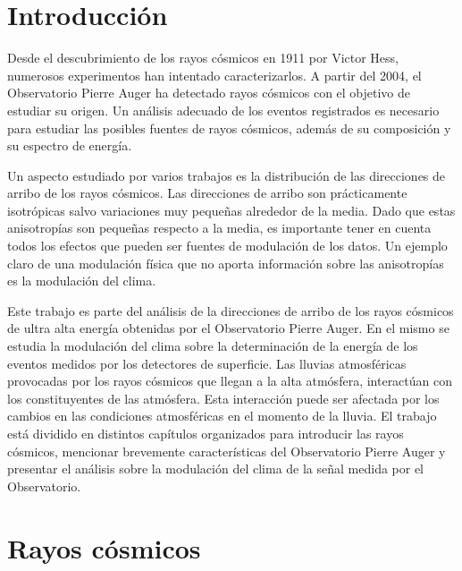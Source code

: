 \chapter{Introducción}


Desde el descubrimiento de los rayos cósmicos en 1911 por Victor Hess, numerosos experimentos han intentado caracterizarlos. A partir del 2004, el Observatorio Pierre Auger ha detectado rayos cósmicos con el objetivo de estudiar su origen. Un análisis adecuado de los eventos registrados es necesario para estudiar las posibles fuentes de rayos cósmicos, además de su composición y su espectro de energía.

Un aspecto estudiado por varios trabajos \cite{collaboration2013pierre} \cite{data} es la distribución  de las direcciones de arribo de los rayos cósmicos. Las direcciones de arribo son prácticamente isotrópicas salvo variaciones muy pequeñas alrededor de la media. Dado que estas  anisotropías son pequeñas respecto a la media, es importante tener en cuenta todos los efectos que pueden ser fuentes de modulación de los datos. Un ejemplo claro de una modulación física que no aporta información sobre las anisotropías es la modulación del clima.

Este trabajo es parte del análisis de la direcciones de arribo de los rayos cósmicos de ultra alta energía obtenidas por el Observatorio Pierre Auger. En el mismo se estudia la modulación del clima sobre la determinación de la energía de los eventos medidos por los detectores de superficie. Las lluvias atmosféricas provocadas por los rayos cósmicos que llegan a la alta atmósfera, interactúan con los constituyentes de las atmósfera. Esta interacción puede ser afectada por los cambios en las condiciones atmosféricas en el momento de la lluvia. El trabajo está dividido en distintos capítulos organizados para introducir las rayos cósmicos, mencionar brevemente características del Observatorio Pierre Auger y presentar el análisis sobre la modulación del clima de la señal medida por el Observatorio.

\chapter{Rayos cósmicos}

